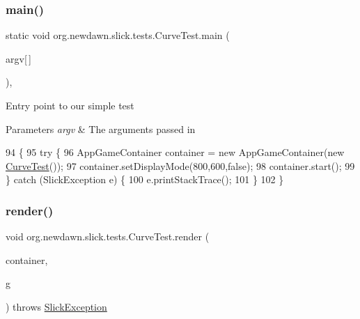 \subsubsection{\texorpdfstring{main()}{main()}}
{\footnotesize\ttfamily static void org.\+newdawn.\+slick.\+tests.\+Curve\+Test.\+main (\begin{DoxyParamCaption}\item[{String}]{argv\mbox{[}$\,$\mbox{]} }\end{DoxyParamCaption})\hspace{0.3cm}{\ttfamily [inline]}, {\ttfamily [static]}}

Entry point to our simple test


\begin{DoxyParams}{Parameters}
{\em argv} & The arguments passed in \\
\hline
\end{DoxyParams}

\begin{DoxyCode}
94                                            \{
95         \textcolor{keywordflow}{try} \{
96             AppGameContainer container = \textcolor{keyword}{new} AppGameContainer(\textcolor{keyword}{new} \mbox{\hyperlink{classorg_1_1newdawn_1_1slick_1_1tests_1_1_curve_test_a7b97731316fe7d7ce7cc74c697627599}{CurveTest}}());
97             container.setDisplayMode(800,600,\textcolor{keyword}{false});
98             container.start();
99         \} \textcolor{keywordflow}{catch} (SlickException e) \{
100             e.printStackTrace();
101         \}
102     \}
\end{DoxyCode}
\mbox{\label{classorg_1_1newdawn_1_1slick_1_1tests_1_1_curve_test_adc127706cf50f25dc28d1a0ee9836047}} 
\subsubsection{\texorpdfstring{render()}{render()}}
{\footnotesize\ttfamily void org.\+newdawn.\+slick.\+tests.\+Curve\+Test.\+render (\begin{DoxyParamCaption}\item[{\mbox{\hyperlink{classorg_1_1newdawn_1_1slick_1_1_game_container}{Game\+Container}}}]{container,  }\item[{\mbox{\hyperlink{classorg_1_1newdawn_1_1slick_1_1_graphics}{Graphics}}}]{g }\end{DoxyParamCaption}) throws \mbox{\hyperlink{classorg_1_1newdawn_1_1slick_1_1_slick_exception}{Slick\+Exception}}\hspace{0.3cm}{\ttfamily [inline]}}

